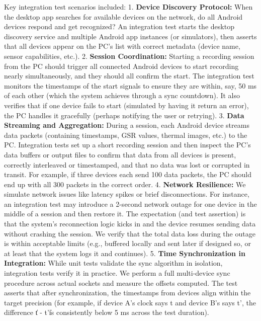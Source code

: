 \documentclass[11pt,a4paper]{report}
\begin{document}
Key integration test scenarios included: 1. \textbf{Device Discovery
Protocol:} When the desktop app searches for available devices on the
network, do all Android devices respond and get recognized? An
integration test starts the desktop discovery service and multiple
Android app instances (or simulators), then asserts that all devices
appear on the PC's list with correct metadata (device name, sensor
capabilities, etc.). 2. \textbf{Session Coordination:} Starting a recording
session from the PC should trigger all connected Android devices to
start recording nearly simultaneously, and they should all confirm the
start. The integration test monitors the timestamps of the start signals
to ensure they are within, say, 50 ms of each other (which the system
achieves through a sync countdown). It also verifies that if one device
fails to start (simulated by having it return an error), the PC handles
it gracefully (perhaps notifying the user or retrying). 3. \textbf{Data
Streaming and Aggregation:} During a session, each Android device
streams data packets (containing timestamps, GSR values, thermal images,
etc.) to the PC. Integration tests set up a short recording session and
then inspect the PC's data buffers or output files to confirm that data
from all devices is present, correctly interleaved or timestamped, and
that no data was lost or corrupted in transit. For example, if three
devices each send 100 data packets, the PC should end up with all 300
packets in the correct order. 4. \textbf{Network Resilience:} We simulate
network issues like latency spikes or brief disconnections. For
instance, an integration test may introduce a 2-second network outage
for one device in the middle of a session and then restore it. The
expectation (and test assertion) is that the system's reconnection logic
kicks in and the device resumes sending data without crashing the
session. We verify that the total data loss during the outage is within
acceptable limits (e.g., buffered locally and sent later if designed so,
or at least that the system logs it and continues). 5. \textbf{Time
Synchronization in Integration:} While unit tests validate the sync
algorithm in isolation, integration tests verify it in practice. We
perform a full multi-device sync procedure across actual sockets and
measure the offsets computed. The test asserts that after
synchronization, the timestamps from devices align within the target
precision (for example, if device A's clock says t and device B's says
t', the difference \|t - t'\| is consistently below 5 ms across the
test duration).
\end{document}
